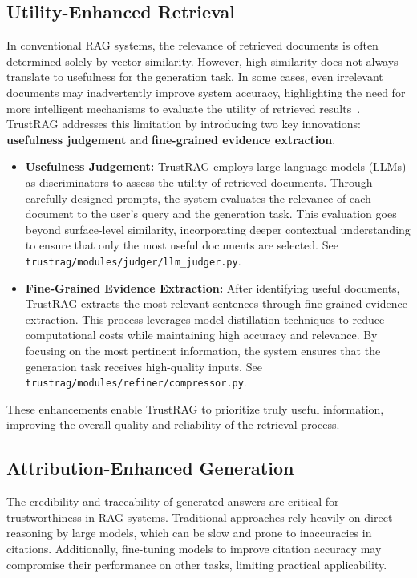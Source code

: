 \subsection{Utility-Enhanced Retrieval}
In conventional RAG systems, the relevance of retrieved documents is often determined solely by vector similarity. However, high similarity does not always translate to usefulness for the generation task. In some cases, even irrelevant documents may inadvertently improve system accuracy, highlighting the need for more intelligent mechanisms to evaluate the utility of retrieved results~\cite{cuconasu2024power}.
TrustRAG addresses this limitation by introducing two key innovations: \textbf{usefulness judgement} and \textbf{fine-grained evidence extraction}.
\begin{itemize}
    \item \textbf{Usefulness Judgement:} TrustRAG employs large language models (LLMs) as discriminators to assess the utility of retrieved documents. Through carefully designed prompts, the system evaluates the relevance of each document to the user's query and the generation task. This evaluation goes beyond surface-level similarity, incorporating deeper contextual understanding to ensure that only the most useful documents are selected. See \texttt{trustrag/modules/judger/llm\_judger.py}.
    
    \item \textbf{Fine-Grained Evidence Extraction:} After identifying useful documents, TrustRAG extracts the most relevant sentences through fine-grained evidence extraction. This process leverages model distillation techniques to reduce computational costs while maintaining high accuracy and relevance. By focusing on the most pertinent information, the system ensures that the generation task receives high-quality inputs. See \texttt{trustrag/modules/refiner/compressor.py}.
\end{itemize}
These enhancements enable TrustRAG to prioritize truly useful information, improving the overall quality and reliability of the retrieval process.

\subsection{Attribution-Enhanced Generation}
The credibility and traceability of generated answers are critical for trustworthiness in RAG systems. Traditional approaches rely heavily on direct reasoning by large models, which can be slow and prone to inaccuracies in citations. Additionally, fine-tuning models to improve citation accuracy may compromise their performance on other tasks, limiting practical applicability.

